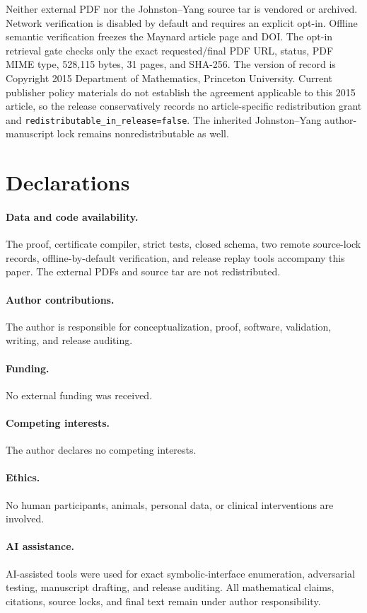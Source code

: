 \documentclass[11pt]{article}
\theoremstyle{definition}
\theoremstyle{remark}
\begin{document}
Neither external PDF nor the Johnston--Yang source tar is vendored or
archived.  Network verification is disabled by default and requires an
explicit opt-in.  Offline semantic verification freezes the Maynard
article page and DOI.  The opt-in retrieval gate checks only the exact
requested/final PDF URL, status, PDF MIME type, 528,115 bytes, 31 pages,
and SHA-256.  The version of record is Copyright 2015 Department of
Mathematics, Princeton University.  Current publisher policy materials
do not establish the agreement applicable to this 2015 article, so the
release conservatively records no article-specific redistribution grant
and \texttt{redistributable\_in\_release=false}.  The inherited
Johnston--Yang author-manuscript lock remains nonredistributable as well.

\section*{Declarations}

\paragraph{Data and code availability.}
The proof, certificate compiler, strict tests, closed schema, two remote
source-lock records, offline-by-default verification, and release replay
tools accompany this paper.  The external PDFs and source tar are not
redistributed.

\paragraph{Author contributions.}
The author is responsible for conceptualization, proof, software,
validation, writing, and release auditing.

\paragraph{Funding.}
No external funding was received.

\paragraph{Competing interests.}
The author declares no competing interests.

\paragraph{Ethics.}
No human participants, animals, personal data, or clinical interventions
are involved.

\paragraph{AI assistance.}
AI-assisted tools were used for exact symbolic-interface enumeration,
adversarial testing, manuscript drafting, and release auditing.  All
mathematical claims, citations, source locks, and final text remain under
author responsibility.



\end{document}
